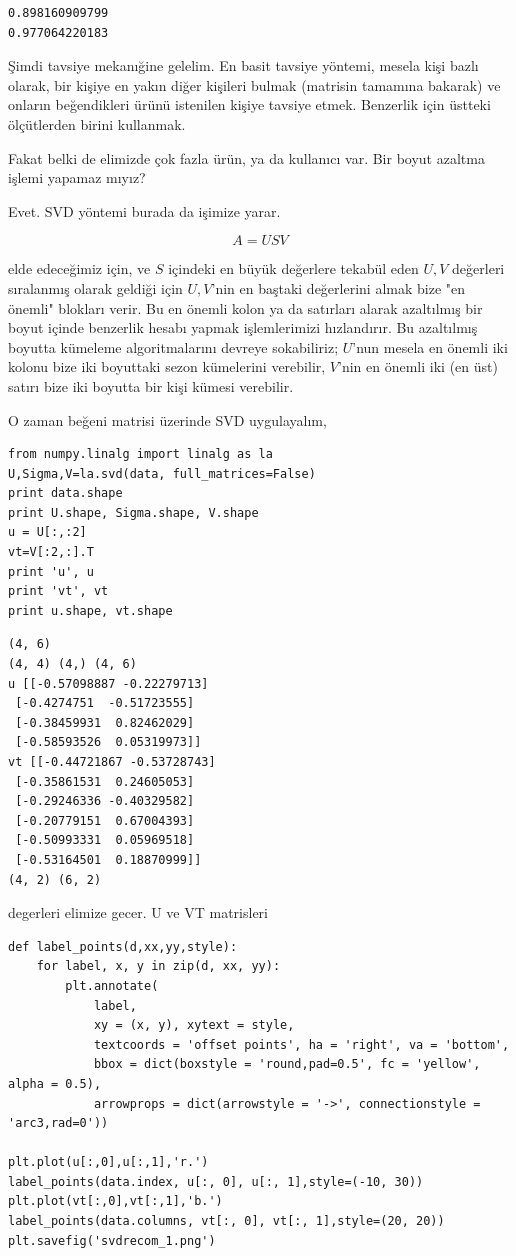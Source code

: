 \documentclass[12pt,fleqn]{article}\usepackage{../../common}
\begin{document}
\begin{verbatim}
0.898160909799
0.977064220183
\end{verbatim}

Şimdi tavsiye mekanığine gelelim. En basit tavsiye yöntemi, mesela
kişi bazlı olarak, bir kişiye en yakın diğer kişileri bulmak (matrisin
tamamına bakarak) ve onların beğendikleri ürünü istenilen kişiye
tavsiye etmek. Benzerlik için üstteki ölçütlerden birini kullanmak.

Fakat belki de elimizde çok fazla ürün, ya da kullanıcı var. Bir boyut
azaltma işlemi yapamaz mıyız?

Evet. SVD yöntemi burada da işimize yarar. 

$$ A = USV  $$

elde edeceğimiz için, ve $S$ içindeki en büyük değerlere tekabül eden
$U,V$ değerleri sıralanmış olarak geldiği için $U,V$'nin en baştaki
değerlerini almak bize "en önemli" blokları verir. Bu en önemli kolon
ya da satırları alarak azaltılmış bir boyut içinde benzerlik hesabı
yapmak işlemlerimizi hızlandırır. Bu azaltılmış boyutta kümeleme
algoritmalarını devreye sokabiliriz; $U$'nun mesela en önemli iki
kolonu bize iki boyuttaki sezon kümelerini verebilir, $V$'nin en
önemli iki (en üst) satırı bize iki boyutta bir kişi kümesi verebilir.

O zaman beğeni matrisi üzerinde SVD uygulayalım,

\begin{verbatim}
from numpy.linalg import linalg as la
U,Sigma,V=la.svd(data, full_matrices=False)
print data.shape
print U.shape, Sigma.shape, V.shape
u = U[:,:2]
vt=V[:2,:].T
print 'u', u
print 'vt', vt
print u.shape, vt.shape
\end{verbatim}

\begin{verbatim}
(4, 6)
(4, 4) (4,) (4, 6)
u [[-0.57098887 -0.22279713]
 [-0.4274751  -0.51723555]
 [-0.38459931  0.82462029]
 [-0.58593526  0.05319973]]
vt [[-0.44721867 -0.53728743]
 [-0.35861531  0.24605053]
 [-0.29246336 -0.40329582]
 [-0.20779151  0.67004393]
 [-0.50993331  0.05969518]
 [-0.53164501  0.18870999]]
(4, 2) (6, 2)
\end{verbatim}

degerleri elimize gecer. U ve VT matrisleri 

\begin{verbatim}
def label_points(d,xx,yy,style):
    for label, x, y in zip(d, xx, yy):
        plt.annotate(
            label, 
            xy = (x, y), xytext = style,
            textcoords = 'offset points', ha = 'right', va = 'bottom',
            bbox = dict(boxstyle = 'round,pad=0.5', fc = 'yellow', alpha = 0.5),
            arrowprops = dict(arrowstyle = '->', connectionstyle = 'arc3,rad=0'))

plt.plot(u[:,0],u[:,1],'r.')
label_points(data.index, u[:, 0], u[:, 1],style=(-10, 30))
plt.plot(vt[:,0],vt[:,1],'b.')
label_points(data.columns, vt[:, 0], vt[:, 1],style=(20, 20))
plt.savefig('svdrecom_1.png')
\end{verbatim}
\end{document}
